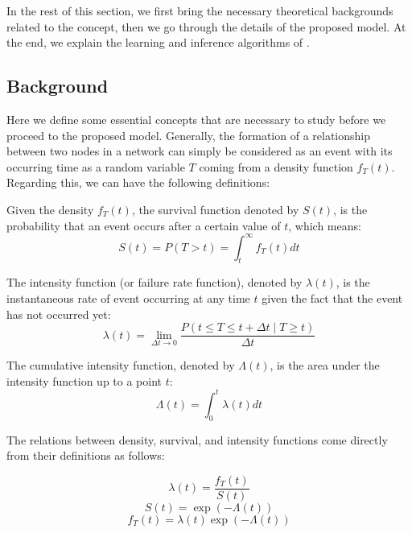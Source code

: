In the rest of this section, we first bring the necessary theoretical backgrounds related to the concept, then we go through the details of the proposed model. At the end, we explain the learning and inference algorithms of \npglm.

\subsection{Background}
Here we define some essential concepts that are necessary to study before we proceed to the proposed model. Generally, the formation of a relationship between two nodes in a network can simply be considered as an event with its occurring time as a random variable $T$ coming from a density function $f_T(t)$. Regarding this, we can have the following definitions:

\begin{definition}
	Given the density $f_T(t)$, the survival function denoted by $S(t)$, is the probability that an event occurs after a certain value of $t$, which means:
	\begin{equation}
	S(t) = P(T > t) = \int_t^\infty f_T(t)dt
	\end{equation}
\end{definition}

\begin{definition}
	The intensity function (or failure rate function), denoted by $\lambda(t)$, is the instantaneous rate of event occurring at any time $t$ given the fact that the event has not occurred yet:
	\begin{equation}
	\lambda(t)=\lim_{\Delta t\rightarrow 0}\frac{P(t\le T\le t+\Delta t\mid T\ge t)}{\Delta t}
	\end{equation}
\end{definition}

\begin{definition}
	The cumulative intensity function, denoted by $\Lambda(t)$, is the area under the intensity function up to a point $t$:
	\begin{equation}\label{eq:Lambda}
	\Lambda(t)=\int_0^t\lambda(t)dt
	\end{equation}
\end{definition}

The relations between density, survival, and intensity functions come directly from their definitions as follows:

\begin{equation}\label{eq:intensity}
\lambda(t)=\frac{f_T(t)}{S(t)}
\end{equation}
\begin{equation}\label{eq:reliability}
S(t)=\exp(-\Lambda(t))
\end{equation}
\begin{equation}\label{eq:density}
f_T(t)=\lambda(t)\exp(-\Lambda(t))
\end{equation}

